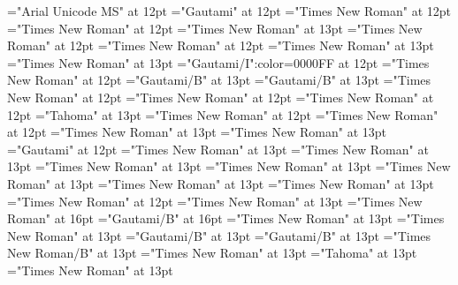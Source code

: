 \documentclass[a4paper]{article}
\begin{document}
\pagestyle{plain}
\sloppy
\setlength{\parfillskip}{0pt plus 1fil}
\font\xitemhi="Arial Unicode MS" at 12pt
\font\xitemte="Gautami" at 12pt
\font\xitemxitemCmPossibilitypublishStemTransTypeAbbreviationPubbefore="Times New Roman" at 12pt
\font\xitemxitemcomplexformrefsbefore="Times New Roman" at 12pt
\font\xitemxitemdefinitionbefore="Times New Roman" at 13pt
\font\xitemxitemdefinitionLcbefore="Times New Roman" at 12pt
\font\xitemxitemdefinitionLdbefore="Times New Roman" at 12pt
\font\xitemxitementryrefcomponentbefore="Times New Roman" at 13pt
\font\xitemxitementryreftypebefore="Times New Roman" at 13pt
\font\xitemxitemexamplebefore="Gautami/I":color=0000FF at 12pt
\font\xitemxitemexamplesbefore="Times New Roman" at 12pt
\font\xitemxitemheadwordbefore="Gautami/B" at 13pt
\font\xitemxitemLexEntrypublishStemComponentTargetHeadWordRefbefore="Gautami/B" at 13pt
\font\xitemxitemLexSensepublishStemDefinitionPubbefore="Times New Roman" at 12pt
\font\xitemxitemLexSensepublishStemDefinitionPubLdbefore="Times New Roman" at 12pt
\font\xitemxitemprimaryrefsbefore="Times New Roman" at 12pt
\font\xitemxitempronunciationbefore="Tahoma" at 13pt
\font\xitemxitempronunciationsbefore="Times New Roman" at 12pt
\font\xitemxitemsemanticdomainsbefore="Times New Roman" at 12pt
\font\sensesensesensesbefore="Times New Roman" at 13pt
\font\xitemxitemtranslationbefore="Times New Roman" at 13pt
\font\xitemxitemtranslationLdbefore="Gautami" at 12pt
\font\xitemxitemcrossrefbefore="Times New Roman" at 13pt
\font\xitemxitemcrossreftargetsbefore="Times New Roman" at 13pt
\font\xitemxitemcrossreftypebefore="Times New Roman" at 13pt
\font\xitemxitemheadwordminorbefore="Times New Roman" at 13pt
\font\xitemxitemmainentryrefbefore="Times New Roman" at 13pt
\font\xitemxitemmainentryrefminorbefore="Times New Roman" at 13pt
\font\xitemxitempronunciationminorbefore="Times New Roman" at 13pt
\font\xitemxitemsensecrossrefbefore="Times New Roman" at 12pt
\font\xitemxitemsensemainentryrefbefore="Times New Roman" at 13pt
\font{}="Times New Roman" at 16pt
\font{}="Gautami/B" at 16pt
\font{}="Times New Roman" at 13pt
\font\entryletDatadicBody="Times New Roman" at 13pt
\font\headwordggoTeluINentryletDatadicBody="Gautami/B" at 13pt
\font\headwordafterentryletDatadicBody="Gautami/B" at 13pt
\font\spanenheadwordggoTeluINentryletDatadicBody="Times New Roman/B" at 13pt
\font\spanentryletDatadicBody="Times New Roman" at 13pt
\font\pronunciationggofonipaxemicspanentryletDatadicBody="Tahoma" at 13pt
\font\spanenpronunciationggofonipaxemicspanentryletDatadicBody="Times New Roman" at 13pt
\end{document}
